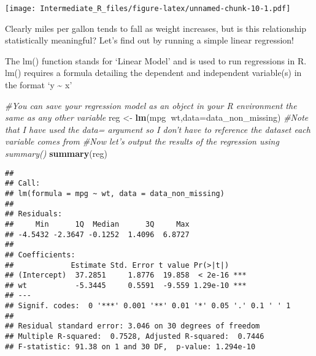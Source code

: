 \documentclass[]{article}
\newenvironment{Shaded}{\begin{snugshade}}{\end{snugshade}}
\newcommand{\KeywordTok}[1]{\textcolor[rgb]{0.13,0.29,0.53}{\textbf{#1}}}
\newcommand{\DataTypeTok}[1]{\textcolor[rgb]{0.13,0.29,0.53}{#1}}
\newcommand{\StringTok}[1]{\textcolor[rgb]{0.31,0.60,0.02}{#1}}
\newcommand{\CommentTok}[1]{\textcolor[rgb]{0.56,0.35,0.01}{\textit{#1}}}
\newcommand{\OperatorTok}[1]{\textcolor[rgb]{0.81,0.36,0.00}{\textbf{#1}}}
\newcommand{\NormalTok}[1]{#1}
\begin{document}
\begin{Shaded}
\end{Shaded}

\texttt{[image: Intermediate\_R\_files/figure-latex/unnamed-chunk-10-1.pdf]}

Clearly miles per gallon tends to fall as weight increases, but is this
relationship statistically meaningful? Let's find out by running a
simple linear regression!

The lm() function stands for `Linear Model' and is used to run
regressions in R. lm() requires a formula detailing the dependent and
independent variable(s) in the format `y \textasciitilde{} x'

\begin{Shaded}
\begin{Highlighting}[]
\CommentTok{#You can save your regression model as an object in your R environment the same as any other variable}
\NormalTok{reg <-}\StringTok{ }\KeywordTok{lm}\NormalTok{(mpg}\OperatorTok{~}\NormalTok{wt,}\DataTypeTok{data=}\NormalTok{data_non_missing)}
\CommentTok{#Note that I have used the data= argument so I don't have to reference the dataset each variable comes from}
\CommentTok{#Now let's output the results of the regression using summary()}
\KeywordTok{summary}\NormalTok{(reg)}
\end{Highlighting}
\end{Shaded}

\begin{verbatim}
## 
## Call:
## lm(formula = mpg ~ wt, data = data_non_missing)
## 
## Residuals:
##     Min      1Q  Median      3Q     Max 
## -4.5432 -2.3647 -0.1252  1.4096  6.8727 
## 
## Coefficients:
##             Estimate Std. Error t value Pr(>|t|)    
## (Intercept)  37.2851     1.8776  19.858  < 2e-16 ***
## wt           -5.3445     0.5591  -9.559 1.29e-10 ***
## ---
## Signif. codes:  0 '***' 0.001 '**' 0.01 '*' 0.05 '.' 0.1 ' ' 1
## 
## Residual standard error: 3.046 on 30 degrees of freedom
## Multiple R-squared:  0.7528, Adjusted R-squared:  0.7446 
## F-statistic: 91.38 on 1 and 30 DF,  p-value: 1.294e-10
\end{verbatim}
\end{document}

